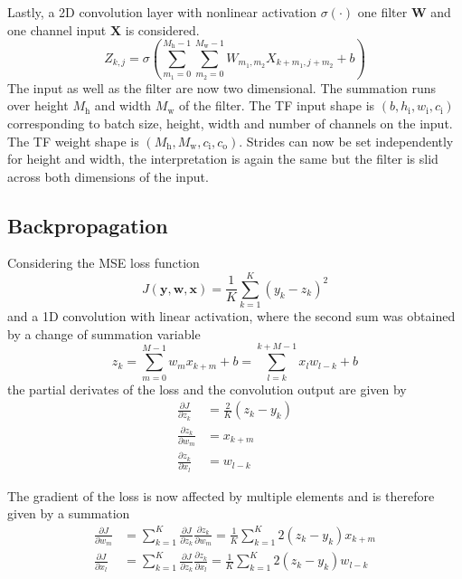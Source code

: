 \documentclass[12pt,a4paper]{scrartcl}
\newcommand{\matr}[1]{\mathbf{#1}}
\begin{document}
	Lastly, a 2D convolution layer with nonlinear activation $\sigma(\cdot)$ one filter $\matr{W}$ and one channel input $\matr{X}$ is considered.
	\begin{equation}
		Z_{k,j} = \sigma\left(\sum_{m_1=0}^{M_\mathrm{h}-1} \sum_{m_2=0}^{M_\mathrm{w}-1} W_{m_1,m_2} X_{k+m_1,j+m_2} + b \right)
	\end{equation}
	The input as well as the filter are now two dimensional. The summation runs over height $M_\mathrm{h}$ and width $M_\mathrm{w}$ of the filter.
	The TF input shape is $(b,h_\mathrm{i},w_\mathrm{i},c_\mathrm{i})$ corresponding to batch size, height, width and number of channels on the input.
	The TF weight shape is $(M_\mathrm{h},M_\mathrm{w},c_\mathrm{i},c_\mathrm{o})$.
	Strides can now be set independently for height and width, the interpretation is again the same but the filter is slid across both dimensions of the input.
	
	\subsection*{Backpropagation}
	
	Considering the MSE loss function 
	\begin{equation}
		J\left(\matr{y}, \matr{w}, \matr{x}\right) = \frac{1}{K} \sum_{k=1}^{K} \left(y_k-z_k \right)^2
	\end{equation}
	and a 1D convolution with linear activation, where the second sum was obtained by a change of summation variable
	\begin{equation}
		z_k = \sum_{m=0}^{M-1} w_m x_{k+m} + b = \sum_{l=k}^{k+M-1} x_l w_{l-k} + b
	\end{equation}
	the partial derivates of the loss and the convolution output are given by
	\begin{align}
		\frac{\partial J}{\partial z_k} &= \frac{2}{K} \left(z_k-y_k\right) \\
		\frac{\partial z_k}{\partial w_m} &= x_{k+m} \\
		\frac{\partial z_k}{\partial x_l} &= w_{l-k}
	\end{align}

	The gradient of the loss is now affected by multiple elements and is therefore given by a summation
	\begin{align}
		\frac{\partial J}{\partial w_m} &= \sum_{k=1}^{K} \frac{\partial J}{\partial z_k} \frac{\partial z_k}{\partial w_m} = \frac{1}{K} \sum_{k=1}^{K} 2\left(z_k-y_k\right) x_{k+m} \label{eq:grad1} \\
		\frac{\partial J}{\partial x_l} &= \sum_{k=1}^{K} \frac{\partial J}{\partial z_k} \frac{\partial z_k}{\partial x_l} = \frac{1}{K} \sum_{k=1}^{K} 2\left(z_k-y_k \right)w_{l-k} \label{eq:grad2}
	\end{align}
	
\end{document}
